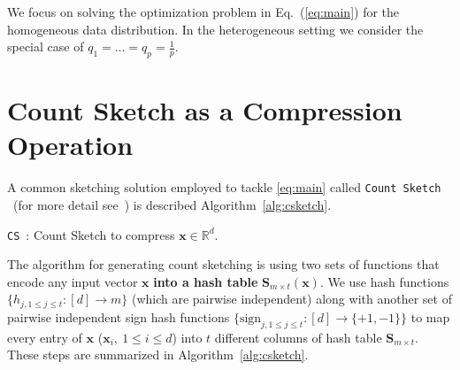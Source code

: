 \documentclass[twoside]{article}
\begin{document}
We focus on solving the optimization problem in Eq.~(\ref{eq:main}) for the homogeneous data distribution.
In the heterogeneous setting we consider the special case of $q_1=\ldots=q_p=\frac{1}{p}$. 

\section{Count Sketch as a Compression Operation}\label{sec:compression}

A common sketching solution employed to tackle \eqref{eq:main} called \texttt{Count Sketch} ~(for more detail see~\cite{DBLP:journals/tcs/CharikarCF04}) is described Algorithm~\ref{alg:csketch}.
\begin{algorithm}[b]
\caption{\texttt{CS}~\cite{kleinberg2003bursty}: Count Sketch to compress ${\boldsymbol{x}}\in\mathbb{R}^{d}$. }\label{alg:csketch}
\begin{algorithmic}[1]
\end{algorithmic}
\end{algorithm}
The algorithm for generating count sketching is using two sets of functions that encode any input vector $\boldsymbol{x}$ \textbf{into a hash table} $\boldsymbol{S}_{m\times t}(\boldsymbol{x})$. We use hash functions $\{h_{j,1\leq j\leq t }:[d]\rightarrow m\}$ (which are pairwise independent) along with another set of pairwise independent sign hash functions $\{\text{sign}_{j,1\leq j\leq t}: [d]\rightarrow \{+1,-1\}\}$ to map every entry of $\boldsymbol{x}$ ($\boldsymbol{x}_i, \:1\leq i\leq d$) into $t$ different columns of hash table $\mathbf{S}_{m\times t}$. 
These steps are summarized in Algorithm~\ref{alg:csketch}.  
   
\end{document}
